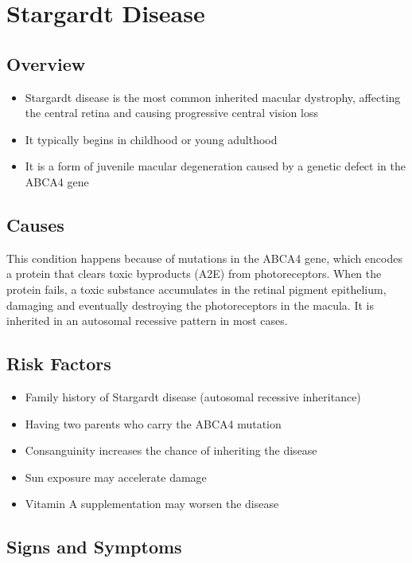 \chapter{Stargardt Disease}
\label{sec:Stargardt Disease}

\section{Overview}
\begin{itemize}[noitemsep]
  \item Stargardt disease is the most common inherited macular dystrophy, affecting the central retina and causing progressive central vision loss
  \item It typically begins in childhood or young adulthood
  \item It is a form of juvenile macular degeneration caused by a genetic defect in the ABCA4 gene
\end{itemize}
\section{Causes}
This condition happens because of mutations in the ABCA4 gene, which encodes a protein that clears toxic byproducts (A2E) from photoreceptors. When the protein fails, a toxic substance accumulates in the retinal pigment epithelium, damaging and eventually destroying the photoreceptors in the macula. It is inherited in an autosomal recessive pattern in most cases.
\section{Risk Factors}
\begin{itemize}[noitemsep]
  \item Family history of Stargardt disease (autosomal recessive inheritance)
  \item Having two parents who carry the ABCA4 mutation
  \item Consanguinity increases the chance of inheriting the disease
  \item Sun exposure may accelerate damage
  \item Vitamin A supplementation may worsen the disease
\end{itemize}
\section{Signs and Symptoms}
